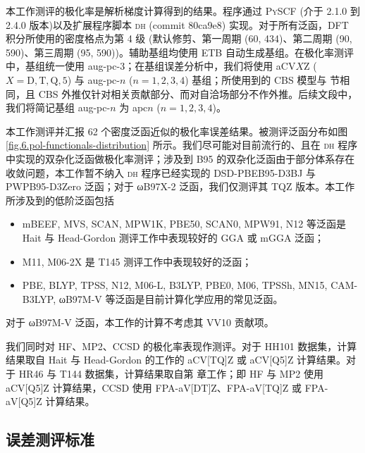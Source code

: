 本工作测评的极化率是解析梯度计算得到的结果。程序通过 \textsc{PySCF} (介于 2.1.0 到 2.4.0 版本)以及扩展程序脚本 \textsc{dh} (commit 80ca9e8) 实现。对于所有泛函，DFT 积分所使用的密度格点为第 4 级 (默认修剪、第一周期 (60, 434)、第二周期 (90, 590)、第三周期 (95, 590))。辅助基组均使用 ETB 自动生成基组。在极化率测评中，基组统一使用 aug-pc-3；在基组误差分析中，我们将使用 aCV$X$Z ($X = \mathrm{D, T, Q, 5}$) 与 aug-pc-$n$ ($n = 1, 2, 3, 4$) 基组；所使用到的 CBS 模型与  节相同，且 CBS 外推仅针对相关贡献部分、而对自洽场部分不作外推。后续文段中，我们将简记基组 aug-pc-$n$ 为 apc$n$ ($n = 1, 2, 3, 4$)。

本工作测评并汇报 62 个密度泛函近似的极化率误差结果。被测评泛函分布如图 \ref{fig.6.pol-functionals-distribution} 所示。我们尽可能对目前流行的、且在 \textsc{dh} 程序中实现的双杂化泛函做极化率测评；涉及到 B95 的双杂化泛函由于部分体系存在收敛问题，本工作暂不纳入 \textsc{dh} 程序已经实现的 DSD-PBEB95-D3BJ 与 PWPB95-D3Zero 泛函；对于 ωB97X-2 泛函，我们仅测评其 TQZ 版本。本工作所涉及到的低阶泛函包括
\begin{itemize}[nosep]
    \item mBEEF, MVS, SCAN, MPW1K, PBE50, SCAN0, MPW91, N12 等泛函是 Hait 与 Head-Gordon 测评工作\cite{Hait-Head-Gordon.PCCP.2018}中表现较好的 GGA 或 mGGA 泛函；
    \item M11, M06-2X 是 T145 测评工作\cite{Wu-Thakkar.CPL.2015}中表现较好的泛函；
    \item PBE, BLYP, TPSS, N12, M06-L, B3LYP, PBE0, M06, TPSSh, MN15, CAM-B3LYP, ωB97M-V 等泛函是目前计算化学应用的常见泛函。
\end{itemize}
对于 ωB97M-V 泛函，本工作的计算不考虑其 VV10 贡献项。

我们同时对 HF、MP2、CCSD 的极化率表现作测评。对于 HH101 数据集，计算结果取自 Hait 与 Head-Gordon 的工作的 aCV[TQ]Z 或 aCV[Q5]Z 计算结果。对于 HR46 与 T144 数据集，计算结果取自第  章工作；即 HF 与 MP2 使用 aCV[Q5]Z 计算结果，CCSD 使用 FPA-aV[DT]Z、FPA-aV[TQ]Z 或 FPA-aV[Q5]Z 计算结果。

\subsection{误差测评标准}

